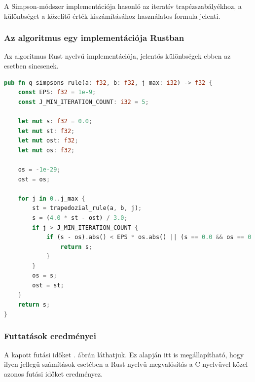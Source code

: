 A Simpson-módszer implementációja hasonló az iteratív trapézszabályékhoz, a különbséget a közelítő érték kiszámításához használatos formula jelenti.

\subsubsection{Az algoritmus egy implementációja Rustban}

Az algoritmus Rust nyelvű implementációja, jelentős különbségek ebben az esetben sincsenek.
\begin{lstlisting}[language=Rust]
pub fn q_simpsons_rule(a: f32, b: f32, j_max: i32) -> f32 {
    const EPS: f32 = 1e-9;
    const J_MIN_ITERATION_COUNT: i32 = 5;

    let mut s: f32 = 0.0;
    let mut st: f32;
    let mut ost: f32;
    let mut os: f32;

    os = -1e-29;
    ost = os;

    for j in 0..j_max {
        st = trapedozial_rule(a, b, j);
        s = (4.0 * st - ost) / 3.0;
        if j > J_MIN_ITERATION_COUNT {
            if (s - os).abs() < EPS * os.abs() || (s == 0.0 && os == 0.0) {
                return s;
            }
        }
        os = s;
        ost = st;
    }
    return s;
}
\end{lstlisting}

\subsubsection{Futtatások eredményei}

A kapott futási időket . ábrán láthatjuk. Ez alapján itt is megállapítható, hogy ilyen jellegű számítások esetében a Rust nyelvű megvalósítás a C nyelvűvel közel azonos futási időket eredményez.

